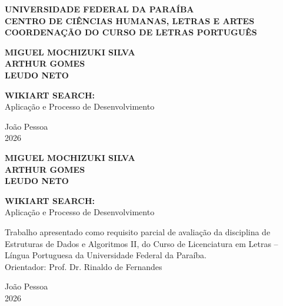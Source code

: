 \documentclass[12pt,a4paper,oneside]{article}
\begin{document}
\begin{titlepage}
\centering

\textbf{\MakeUppercase{Universidade Federal da Paraíba}}\\
\textbf{\MakeUppercase{Centro de Ciências Humanas, Letras e Artes}}\\
\textbf{\MakeUppercase{Coordenação do Curso de Letras Português}}

\vspace{3\baselineskip}

\textbf{MIGUEL MOCHIZUKI SILVA}\\
\textbf{ARTHUR GOMES}\\
\textbf{LEUDO NETO}

\vspace{9\baselineskip}

\textbf{\MakeUppercase{WikiArt Search:}}\\
Aplicação e Processo de Desenvolvimento

\vspace{12\baselineskip}

\vfill

João Pessoa\\
2026

\end{titlepage}

\begin{titlepage}
\thispagestyle{empty}
\centering

\textbf{MIGUEL MOCHIZUKI SILVA}\\
\textbf{ARTHUR GOMES}\\
\textbf{LEUDO NETO}

\vspace{13\baselineskip}

\textbf{\MakeUppercase{WikiArt Search:}}\\
Aplicação e Processo de Desenvolvimento

\vspace{6\baselineskip}

\begin{flushright}
\begin{minipage}{7.5cm}
\footnotesize
Trabalho apresentado como requisito parcial de avaliação da disciplina de Estruturas de Dados e Algoritmos II, do Curso de Licenciatura em Letras -- Língua Portuguesa da Universidade Federal da Paraíba.\\[6pt]
Orientador: Prof. Dr. Rinaldo de Fernandes
\end{minipage}
\end{flushright}

\vfill

João Pessoa\\
2026

\end{titlepage}
\end{document}
